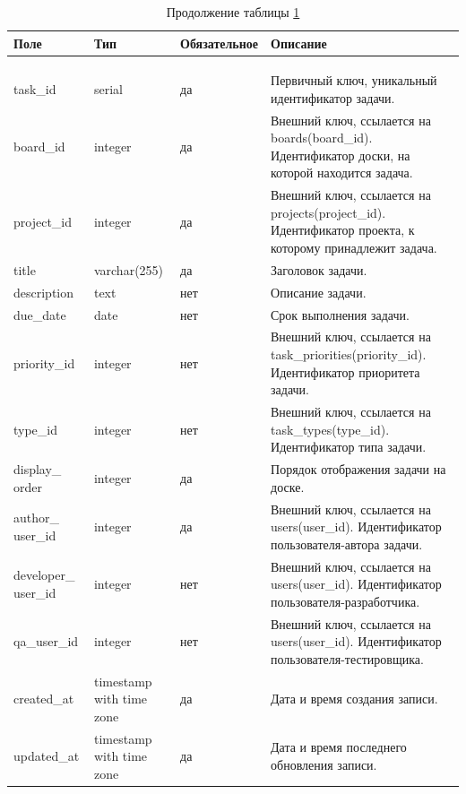 \begin{xltabular}{\textwidth}{|p{2.5cm}|p{4cm}|p{1.7cm}|X|}
	\caption{Атрибуты сущности «Tasks»\label{tasks:table}}\\ \hline
	\centrow Поле & \centrow Тип & \centrow Обяза\-тельное & \centrow Описание \\ \hline
	 &  &  &  \\ \hline
	\endfirsthead
	\caption*{Продолжение таблицы \ref{tasks:table}} \\ \hline
	 &  &  &  \\ \hline
	\finishhead
	task\_id & serial & \centrow да & Первичный ключ, уникальный идентификатор задачи. \\ \hline
	board\_id & integer & \centrow да & Внешний ключ, ссылается на boards(board\_id). Идентификатор доски, на которой находится задача. \\ \hline
	project\_id & integer & \centrow да & Внешний ключ, ссылается на projects(project\_id). Идентификатор проекта, к которому принадлежит задача. \\ \hline
	title & varchar(255) & \centrow да & Заголовок задачи. \\ \hline
	description & text & \centrow нет & Описание задачи. \\ \hline
	due\_date & date & \centrow нет & Срок выполнения задачи. \\ \hline
	priority\_id & integer & \centrow нет & Внешний ключ, ссылается на task\_priorities(priority\_id). Идентификатор приоритета задачи. \\ \hline
	type\_id & integer & \centrow нет & Внешний ключ, ссылается на task\_types(type\_id). Идентификатор типа задачи. \\ \hline
	display\_ order & integer & \centrow да & Порядок отображения задачи на доске. \\ \hline
	author\_ user\_id & integer & \centrow да & Внешний ключ, ссылается на users(user\_id). Идентификатор пользователя-автора задачи. \\ \hline
	developer\_ user\_id & integer & \centrow нет & Внешний ключ, ссылается на users(user\_id). Идентификатор пользователя-разработчика. \\ \hline
	qa\_user\_id & integer & \centrow нет & Внешний ключ, ссылается на users(user\_id). Идентификатор пользователя-тестировщика. \\ \hline
	created\_at & timestamp with time zone & \centrow да & Дата и время создания записи. \\ \hline
	updated\_at & timestamp with time zone & \centrow да & Дата и время последнего обновления записи. \\ \hline
\end{xltabular}